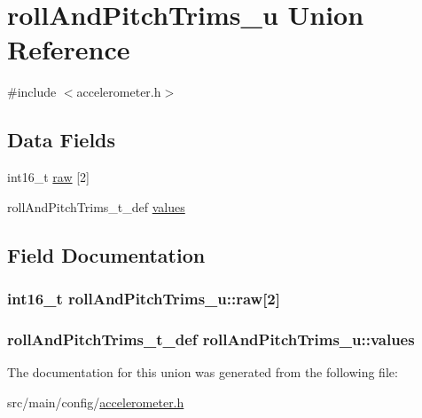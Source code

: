 \hypertarget{unionrollAndPitchTrims__u}{\section{roll\+And\+Pitch\+Trims\+\_\+u Union Reference}
\label{unionrollAndPitchTrims__u}
}


{\ttfamily \#include $<$accelerometer.\+h$>$}

\subsection*{Data Fields}
\begin{DoxyCompactItemize}
\item 
int16\+\_\+t \hyperlink{unionrollAndPitchTrims__u_aa94959ee6e1d0cb44471b8ef15951c1f}{raw} \mbox{[}2\mbox{]}
\item 
roll\+And\+Pitch\+Trims\+\_\+t\+\_\+def \hyperlink{unionrollAndPitchTrims__u_a231e1998bf1e6f1c6548578c63cfbffc}{values}
\end{DoxyCompactItemize}


\subsection{Field Documentation}
\hypertarget{unionrollAndPitchTrims__u_aa94959ee6e1d0cb44471b8ef15951c1f}{
\subsubsection[{raw}]{\setlength{\rightskip}{0pt plus 5cm}int16\+\_\+t roll\+And\+Pitch\+Trims\+\_\+u\+::raw\mbox{[}2\mbox{]}}}\label{unionrollAndPitchTrims__u_aa94959ee6e1d0cb44471b8ef15951c1f}
\hypertarget{unionrollAndPitchTrims__u_a231e1998bf1e6f1c6548578c63cfbffc}{
\subsubsection[{values}]{\setlength{\rightskip}{0pt plus 5cm}roll\+And\+Pitch\+Trims\+\_\+t\+\_\+def roll\+And\+Pitch\+Trims\+\_\+u\+::values}}\label{unionrollAndPitchTrims__u_a231e1998bf1e6f1c6548578c63cfbffc}


The documentation for this union was generated from the following file\+:\begin{DoxyCompactItemize}
\item 
src/main/config/\hyperlink{accelerometer_8h}{accelerometer.\+h}\end{DoxyCompactItemize}
